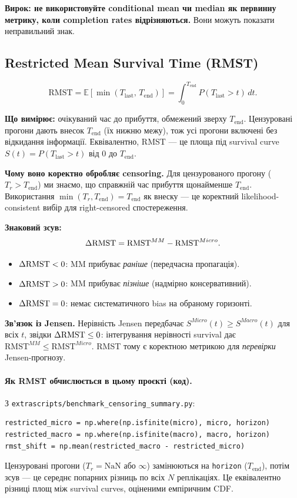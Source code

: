 \documentclass[11pt,a4paper]{article}
\begin{document}
\textbf{Вирок: не використовуйте conditional mean чи median як первинну метрику,
коли completion rates відрізняються.}  Вони можуть показати неправильний знак.

\subsection{Restricted Mean Survival Time (RMST)}
\label{sec:rmst}

\[
  \mathrm{RMST}
  = \mathbb{E}\!\left[\min(T_{\mathrm{last}},\, T_{\mathrm{end}})\right]
  = \int_0^{T_{\mathrm{end}}} P(T_{\mathrm{last}} > t)\, dt.
\]

\textbf{Що вимірює:} очікуваний час до прибуття, обмежений зверху
$T_{\mathrm{end}}$.  Цензуровані прогони дають внесок $T_{\mathrm{end}}$ (їх нижню
межу), тож усі прогони включені без відкидання інформації.
Еквівалентно, RMST --- це площа під survival curve $S(t) =
P(T_{\mathrm{last}} > t)$ від $0$ до $T_{\mathrm{end}}$.

\textbf{Чому воно коректно обробляє censoring.}
Для цензурованого прогону ($T_r > T_{\mathrm{end}}$) ми знаємо, що справжній час
прибуття щонайменше $T_{\mathrm{end}}$.  Використання $\min(T_r, T_{\mathrm{end}}) =
T_{\mathrm{end}}$ як внеску --- це коректний likelihood-consistent
вибір для right-censored спостереження.

\textbf{Знаковий зсув:}
\[
  \Delta\mathrm{RMST} = \mathrm{RMST}^{MM} - \mathrm{RMST}^{Micro}.
\]
\begin{itemize}
  \item $\Delta\mathrm{RMST} < 0$: MM прибуває \emph{раніше} (передчасна пропагація).
  \item $\Delta\mathrm{RMST} > 0$: MM прибуває \emph{пізніше} (надмірно консервативний).
  \item $\Delta\mathrm{RMST} = 0$: немає систематичного bias на обраному горизонті.
\end{itemize}

\textbf{Зв'язок із Jensen.}
Нерівність Jensen передбачає $S^{Micro}(t) \geq S^{Macro}(t)$ для всіх $t$,
звідки $\Delta\mathrm{RMST} \leq 0$: інтегрування нерівності survival дає
$\mathrm{RMST}^{MM} \leq \mathrm{RMST}^{Micro}$.  RMST тому є
коректною метрикою для \emph{перевірки} Jensen-прогнозу.

\paragraph{Як RMST обчислюється в цьому проєкті (код).}
З \texttt{extrascripts/benchmark\_censoring\_summary.py}:
\begin{verbatim}
restricted_micro = np.where(np.isfinite(micro), micro, horizon)
restricted_macro = np.where(np.isfinite(macro), macro, horizon)
rmst_shift = np.mean(restricted_macro - restricted_micro)
\end{verbatim}
Цензуровані прогони ($T_r = \mathrm{NaN}$ або $\infty$) замінюються на \texttt{horizon}
($T_{\mathrm{end}}$), потім зсув --- це середнє попарних різниць
по всіх $N$ реплікаціях.  Це еквівалентно різниці площ між
survival curves, оціненими емпіричним CDF.
\end{document}
